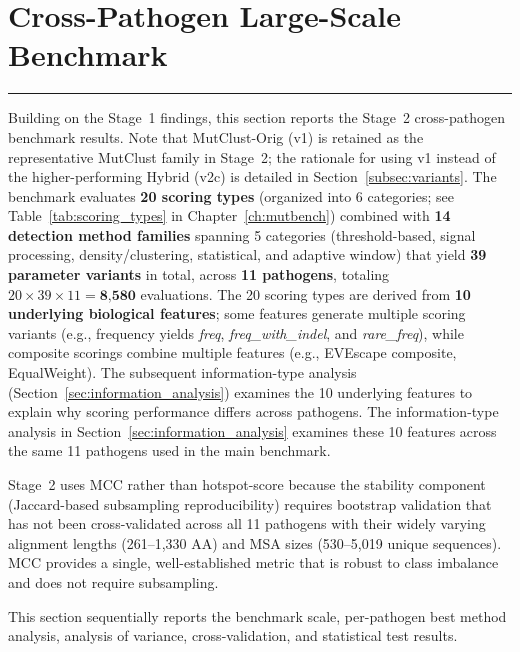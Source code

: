 \section{Cross-Pathogen Large-Scale Benchmark}
\label{sec:9pathogen_results}

\vspace{1em}
\noindent\rule{\textwidth}{0.4pt}
\vspace{0.5em}

Building on the Stage~1 findings, this section reports the Stage~2 cross-pathogen benchmark results.
Note that MutClust-Orig (v1) is retained as the representative MutClust family in Stage~2; the rationale for using v1 instead of the higher-performing Hybrid (v2c) is detailed in Section~\ref{subsec:variants}.
The benchmark evaluates \textbf{20 scoring types} (organized into 6 categories; see Table~\ref{tab:scoring_types} in Chapter~\ref{ch:mutbench}) combined with \textbf{14 detection method families} spanning 5 categories (threshold-based, signal processing, density/clustering, statistical, and adaptive window) that yield \textbf{39 parameter variants} in total, across \textbf{11 pathogens}, totaling $20 \times 39 \times 11 = \textbf{8{,}580}$ evaluations.
The 20 scoring types are derived from \textbf{10 underlying biological features}; some features generate multiple scoring variants (e.g., frequency yields \textit{freq}, \textit{freq\_with\_indel}, and \textit{rare\_freq}), while composite scorings combine multiple features (e.g., EVEscape composite, EqualWeight).
The subsequent information-type analysis (Section~\ref{sec:information_analysis}) examines the 10 underlying features to explain why scoring performance differs across pathogens.
The information-type analysis in Section~\ref{sec:information_analysis} examines these 10 features across the same 11 pathogens used in the main benchmark.

Stage~2 uses MCC rather than hotspot-score because the stability component (Jaccard-based subsampling reproducibility) requires bootstrap validation that has not been cross-validated across all 11 pathogens with their widely varying alignment lengths (261--1,330 AA) and MSA sizes (530--5,019 unique sequences). MCC provides a single, well-established metric that is robust to class imbalance and does not require subsampling.

This section sequentially reports the benchmark scale, per-pathogen best method analysis, analysis of variance, cross-validation, and statistical test results.

